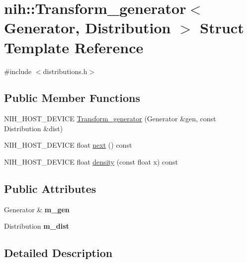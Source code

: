\hypertarget{structnih_1_1_transform__generator}{
\section{nih\-:\-:\-Transform\-\_\-generator$<$ \-Generator, \-Distribution $>$ \-Struct \-Template \-Reference}
\label{structnih_1_1_transform__generator}
}


{\ttfamily \#include $<$distributions.\-h$>$}

\subsection*{\-Public \-Member \-Functions}
\begin{DoxyCompactItemize}
\item 
\-N\-I\-H\-\_\-\-H\-O\-S\-T\-\_\-\-D\-E\-V\-I\-C\-E \hyperlink{structnih_1_1_transform__generator_a2eb6f406cccc2183d8925e850ac5138d}{\-Transform\-\_\-generator} (\-Generator \&gen, const \-Distribution \&dist)
\item 
\-N\-I\-H\-\_\-\-H\-O\-S\-T\-\_\-\-D\-E\-V\-I\-C\-E float \hyperlink{structnih_1_1_transform__generator_a707e7a74d89d556a64d8894bef3f2143}{next} () const 
\item 
\-N\-I\-H\-\_\-\-H\-O\-S\-T\-\_\-\-D\-E\-V\-I\-C\-E float \hyperlink{structnih_1_1_transform__generator_a42b361037ac1879ae4e81f3757b5ce02}{density} (const float x) const 
\end{DoxyCompactItemize}
\subsection*{\-Public \-Attributes}
\begin{DoxyCompactItemize}
\item 
\hypertarget{structnih_1_1_transform__generator_a48eade2bae06dd3aef5280b2b01a9326}{
\-Generator \& {\bfseries m\-\_\-gen}}
\label{structnih_1_1_transform__generator_a48eade2bae06dd3aef5280b2b01a9326}

\item 
\hypertarget{structnih_1_1_transform__generator_a6cc20e94a0c060344d5f48ccbf944513}{
\-Distribution {\bfseries m\-\_\-dist}}
\label{structnih_1_1_transform__generator_a6cc20e94a0c060344d5f48ccbf944513}

\end{DoxyCompactItemize}


\subsection{\-Detailed \-Description}
